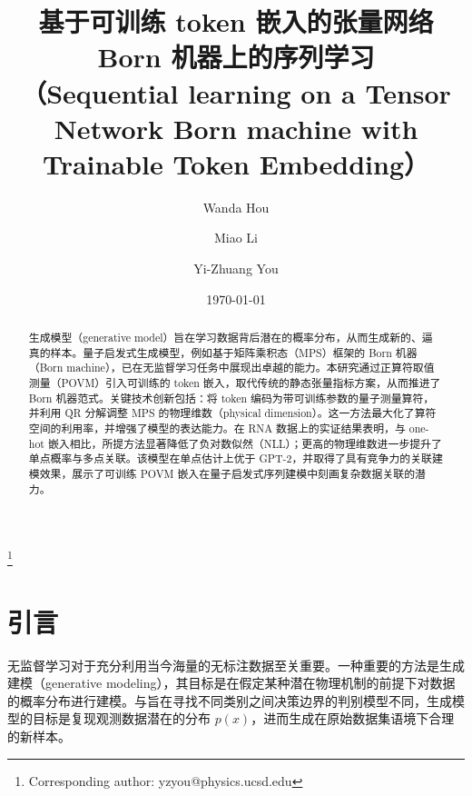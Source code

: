
\setlength{\parindent}{2em}
\renewcommand{\refname}{参考文献}
\renewcommand{\figurename}{图}
\renewcommand{\tablename}{表}
\renewcommand{\acknowledgmentsname}{致谢}

\title{基于可训练 token 嵌入的张量网络 Born 机器上的序列学习\\
（Sequential learning on a Tensor Network Born machine with Trainable Token Embedding）}

\author{Wanda Hou}
\author{Miao Li}
\author{Yi-Zhuang You}
\thanks{Corresponding author: yzyou@physics.ucsd.edu}
\date{\today}

\begin{abstract}
 生成模型（generative model）旨在学习数据背后潜在的概率分布，从而生成新的、逼真的样本。量子启发式生成模型，例如基于矩阵乘积态（MPS）框架的 Born 机器（Born machine），已在无监督学习任务中展现出卓越的能力。本研究通过正算符取值测量（POVM）引入可训练的 token 嵌入，取代传统的静态张量指标方案，从而推进了 Born 机器范式。关键技术创新包括：将 token 编码为带可训练参数的量子测量算符，并利用 QR 分解调整 MPS 的物理维数（physical dimension）。这一方法最大化了算符空间的利用率，并增强了模型的表达能力。在 RNA 数据上的实证结果表明，与 one-hot 嵌入相比，所提方法显著降低了负对数似然（NLL）；更高的物理维数进一步提升了单点概率与多点关联。该模型在单点估计上优于 GPT-2，并取得了具有竞争力的关联建模效果，展示了可训练 POVM 嵌入在量子启发式序列建模中刻画复杂数据关联的潜力。
\end{abstract}

\maketitle

\section{引言}

无监督学习对于充分利用当今海量的无标注数据至关重要。一种重要的方法是生成建模（generative modeling），其目标是在假定某种潜在物理机制的前提下对数据的概率分布进行建模\cite{lecun2015deep,2019RvMP...91d5002C}。与旨在寻找不同类别之间决策边界的判别模型不同，生成模型的目标是复现观测数据潜在的分布 $p(x)$，进而生成在原始数据集语境下合理的新样本。

